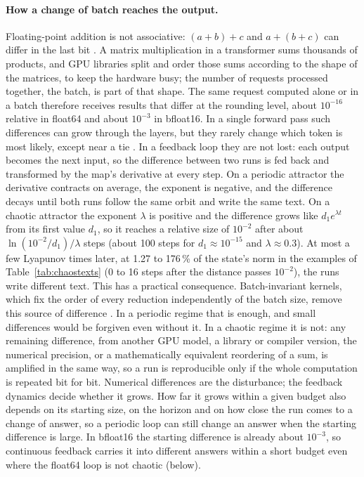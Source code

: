 \documentclass[11pt,letterpaper]{article}
\begin{document}
\paragraph{How a change of batch reaches the output.} Floating-point addition is not associative: $(a+b)+c$ and
$a+(b+c)$ can differ in the last bit \cite{goldberg1991floating}. A matrix multiplication in a transformer sums thousands
of products, and GPU libraries split and order those sums according to the shape of the matrices, to keep the hardware
busy; the number of requests processed together, the batch, is part of that shape. The same request computed alone or
in a batch therefore receives results that differ at the rounding level, about $10^{-16}$ relative in float64 and about
$10^{-3}$ in bfloat16. In a single forward pass such differences can grow through the layers, but they rarely change
which token is most likely, except near a tie \cite{islam2026numerical}. In a feedback loop they are not lost:
each output becomes the next input, so the difference between two runs is fed back and transformed by the map's
derivative at every step. On a periodic attractor the derivative contracts on average, the exponent is negative, and
the difference decays until both runs follow the same orbit and write the same text. On a chaotic attractor the
exponent $\lambda$ is positive and the difference grows like $d_1e^{\lambda t}$ from its first value $d_1$, so it
reaches a relative size of $10^{-2}$ after about $\ln(10^{-2}/d_1)/\lambda$ steps (about 100 steps for $d_1\approx
10^{-15}$ and $\lambda\approx0.3$). At most a few Lyapunov times later, at 1.27 to 176\,\% of the state's norm in the examples of
Table~\ref{tab:chaostexts} (0 to 16 steps after the distance passes $10^{-2}$), the runs write different text. This has a practical consequence.
Batch-invariant kernels, which fix the order of every reduction independently of the batch size, remove this source
of difference \cite{he2025nondeterminism}. In a periodic regime that is enough, and small differences would be forgiven
even without it. In a chaotic regime it is not: any remaining difference, from another GPU model, a library or compiler
version, the numerical precision, or a mathematically equivalent reordering of a sum, is amplified in the same way, so a
run is reproducible only if the whole computation is repeated bit for bit. Numerical differences are the disturbance;
the feedback dynamics decide whether it grows. How far it grows within a given budget also depends on its starting
size, on the horizon and on how close the run comes to a change of answer, so a periodic loop can still change an
answer when the starting difference is large. In bfloat16 the starting difference is already about $10^{-3}$, so continuous
feedback carries it into different answers within a short budget even where the float64 loop is not chaotic (below).
\end{document}
